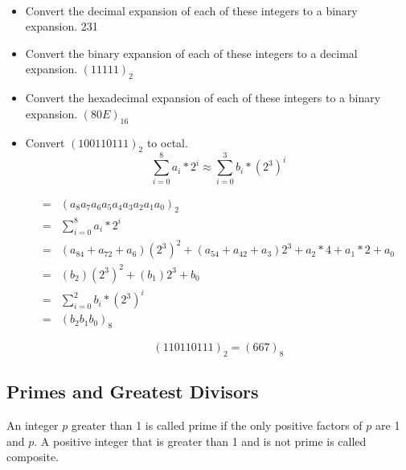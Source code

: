 \begin{exmp} $ $\\

\begin{itemize}
\item Convert the decimal expansion of each of these integers to a binary expansion. 231

\vspace{2cm}

\item  Convert the binary expansion of each of these integers to a decimal expansion.
 $(1 1111)_2$
 \vspace{2cm}

 \item Convert the hexadecimal expansion of each of these integers
to a binary expansion. $(80E)_{16}$

\newpage
\item Convert $(100110111)_2$ to octal.
\newline
\[\sum_{i=0}^8 a_i*2^i\approx \sum_{i=0}^3 b_i*(2^3)^i \]

\begin{align}
=&(a_8a_7a_6a_5a_4a_3a_2a_1a_0)_2\\
=&\sum_{i=0}^8a_i*2^i\\
=&(a_84+a_72+a_6)(2^3)^2+(a_54+a_42+a_3)2^3+a_2*4+a_1*2+a_0\\
=&(b_2)(2^3)^2+(b_1)2^3+b_0\\
=&\sum_{i=0}^2 b_i*(2^3)^i\\
=&(b_2b_1b_0)_{8}
\end{align}

\[(110110111)_2=(667)_{8}\]


\end{itemize}

\end{exmp}

\newpage
\subsection{Primes and Greatest Divisors}
\begin{defn}[prime]
An integer $p$ greater than 1 is called prime if the only positive factors of $p$ are 1 and $p$.
A positive integer that is greater than 1 and is not prime is called composite.
\end{defn}

